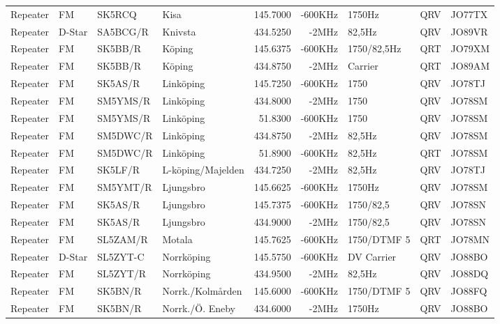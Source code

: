 \begin{landscape}
\begin{longtable}{llllrrlcl}
Repeater & FM     & SK5RCQ   & Kisa              & 145.7000 & -600KHz & 1750Hz        & QRV  & JO77TX \\
Repeater & D-Star & SA5BCG/R & Knivsta           & 434.5250 & -2MHz   & 82,5Hz        & QRV  & JO89VR \\
Repeater & FM     & SK5BB/R  & Köping            & 145.6375 & -600KHz & 1750/82,5Hz   & QRT  & JO79XM \\
Repeater & FM     & SK5BB/R  & Köping            & 434.8750 & -2MHz   & Carrier       & QRT  & JO89AM \\
Repeater & FM     & SK5AS/R  & Linköping         & 145.7250 & -600KHz & 1750          & QRV  & JO78TJ \\
Repeater & FM     & SM5YMS/R & Linköping         & 434.8000 & -2MHz   & 1750          & QRV  & JO78SM \\
Repeater & FM     & SM5YMS/R & Linköping         & 51.8300  & -600KHz & 1750          & QRV  & JO78SM \\
Repeater & FM     & SM5DWC/R & Linköping         & 434.8750 & -2MHz   & 82,5Hz        & QRV  & JO78SM \\
Repeater & FM     & SM5DWC/R & Linköping         & 51.8900  & -600KHz & 82,5Hz        & QRT  & JO78SM \\
Repeater & FM     & SK5LF/R  & L-köping/Majelden & 434.7250 & -2MHz   & 82,5Hz        & QRV  & JO78TJ \\
Repeater & FM     & SM5YMT/R & Ljungsbro         & 145.6625 & -600KHz & 1750Hz        & QRV  & JO78SM \\
Repeater & FM     & SK5AS/R  & Ljungsbro         & 145.7375 & -600KHz & 1750/82,5     & QRV  & JO78SN \\
Repeater & FM     & SK5AS/R  & Ljungsbro         & 434.9000 & -2MHz   & 1750/82,5     & QRV  & JO78SN \\
Repeater & FM     & SL5ZAM/R & Motala            & 145.7625 & -600KHz & 1750/DTMF 5   & QRT  & JO78MN \\
Repeater & D-Star & SL5ZYT-C & Norrköping        & 145.5750 & -600KHz & DV Carrier    & QRV  & JO88BO \\
Repeater & FM     & SL5ZYT/R & Norrköping        & 434.9500 & -2MHz   & 82,5Hz        & QRV  & JO88DQ \\
Repeater & FM     & SK5BN/R  & Norrk./Kolmården  & 145.6000 & -600KHz & 1750/DTMF 5   & QRV  & JO88FQ \\
Repeater & FM     & SK5BN/R  & Norrk./Ö. Eneby   & 434.6000 & -2MHz   & 1750Hz        & QRV  & JO88BO \\

\end{longtable}
\end{landscape}
